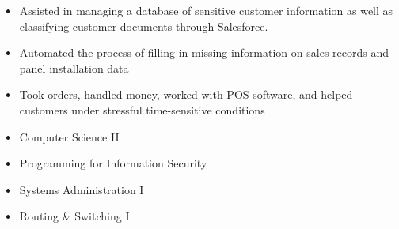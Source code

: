 


\begin{itemize}
\item Assisted in managing a database of sensitive customer information as well as classifying customer documents through Salesforce.
\smallskip
\item Automated the process of filling in missing information on sales records and panel installation data 
\end{itemize}

\divider

\begin{itemize}
\item Took orders, handled money, worked with POS software, and helped customers under stressful time-sensitive conditions
\end{itemize}


\smallskip
\begin{itemize}
\item Computer Science II
\smallskip
\item Programming for Information Security
\smallskip
\item Systems Administration I
\smallskip
\item Routing \& Switching I
\end{itemize}

